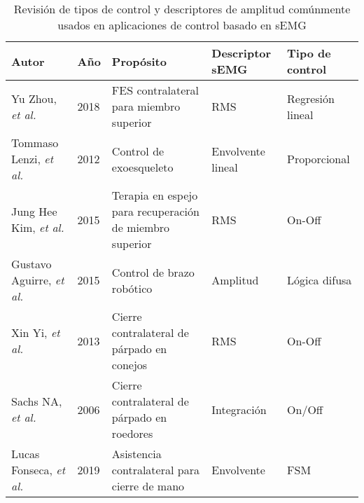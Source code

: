 \begin{table}[htb]
	\centering
	\begin{tabular}{|p{30mm}|p{10mm}|p{45mm}|p{25mm}|p{35mm}|}
	\hline
	\textbf{Autor} & \textbf{Año} & \textbf{Propósito} & \textbf{Descriptor sEMG} & \textbf{Tipo de control}\\
	\hline
	\hline
	Yu Zhou, \emph{et al.} \cite{Zhou2018} & 2018 & FES contralateral para miembro superior & RMS & Regresión lineal\\
	\hline
	Tommaso Lenzi, \emph{et al.} \cite{Lenzi2012} & 2012 & Control de exoesqueleto & Envolvente lineal & Proporcional\\
	\hline
	Jung Hee Kim, \emph{et al.} \cite{Kim2015} & 2015 & Terapia en espejo para recuperación de miembro superior & RMS & On-Off\\
	\hline
	Gustavo Aguirre, \emph{et al.} \cite{Aguirre-Vargas2015} & 2015 & Control de brazo robótico & Amplitud & Lógica difusa\\
	\hline
	Xin Yi, \emph{et al.} \cite{Yi2013} & 2013 & Cierre contralateral de párpado en conejos & RMS & On-Off\\
	\hline
	Sachs NA, \emph{et al.} \cite{Sachs2006} & 2006 & Cierre contralateral de párpado en roedores & Integración & On/Off\\
	\hline
	Lucas Fonseca, \emph{et al.} \cite{Fonseca2019} & 2019 & Asistencia contralateral para cierre de mano & Envolvente & FSM\\
	\hline
	\end{tabular}
	\caption{Revisión de tipos de control y descriptores de amplitud comúnmente usados en aplicaciones de control basado en sEMG}
	\label{Cuadro:Control}
\end{table}

